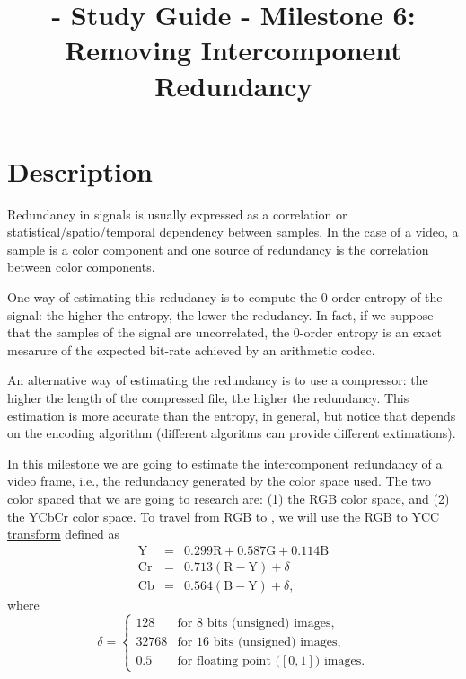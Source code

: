 
\title{\SM{} - Study Guide - Milestone 6: Removing Intercomponent Redundancy}

\maketitle

\section{Description}

Redundancy in signals is usually expressed as a correlation or
statistical/spatio/temporal dependency between samples. In the case of
a video, a sample is a color component and one source of redundancy is
the correlation between color components.

One way of estimating this redudancy is to compute the 0-order entropy
of the signal: the higher the entropy, the lower the redudancy. In
fact, if we suppose that the samples of the signal are uncorrelated,
the 0-order entropy is an exact mesarure of the expected bit-rate
achieved by an arithmetic codec.

An alternative way of estimating the redundancy is to use a
compressor: the higher the length of the compressed file, the higher
the redundancy. This estimation is more accurate than the entropy, in
general, but notice that depends on the encoding algorithm (different
algoritms can provide different extimations).

In this milestone we are going to estimate the intercomponent
redundancy of a video frame, i.e., the redundancy generated by the
color space used. The two color spaced that we are going to research
are: (1) \href{https://en.wikipedia.org/wiki/RGB_color_model}{the RGB
  color space}, and (2) the
\href{https://en.wikipedia.org/wiki/YCbCr}{YCbCr color space}. To travel
from RGB to , we will use
\href{https://docs.opencv.org/3.4/de/d25/imgproc_color_conversions.html}{the
  RGB to YCC transform} defined as
\begin{equation}
  \begin{array}{lcl}
    \text{Y}  & = & 0.299\text{R} + 0.587\text{G} + 0.114\text{B} \\
    \text{Cr} & = & 0.713(\text{R} - \text{Y}) + \delta  \\
    \text{Cb} & = & 0.564(\text{B} - \text{Y}) + \delta,
  \end{array}
\end{equation}
where
\begin{equation}
  \delta = \left\{
  \begin{array}{ll}
    128 & \text{for 8 bits (unsigned) images},\\
    32768 & \text{for 16 bits (unsigned) images},\\
    0.5 & \text{for floating point (}[0,1]\text{) images}.
  \end{array}
  \right.
\end{equation}

